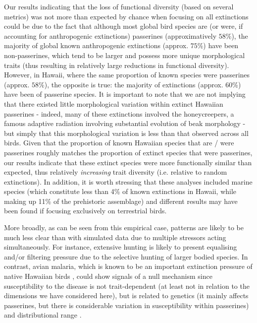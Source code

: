 \documentclass[12pt,letterpaper]{article}
\begin{document}
Our results indicating that the loss of functional diversity (based on several metrics) was not more than expected by chance when focusing on all extinctions could be due to the fact that although most global bird species are (or were, if accounting for anthropogenic extinctions) passerines (approximatively $58$\%), the majority of global known anthropogenic extinctions (approx. $75$\%) have been non-passerines, which tend to be larger and possess more unique morphological traits (thus resulting in relatively large reductions in functional diversity).
However, in Hawaii, where the same proportion of known species were passerines (approx. $58$\%), the opposite is true: the majority of extinctions (approx. $60$\%) have been of passerine species.
It is important to note that we are not implying that there existed little morphological variation within extinct Hawaiian passerines - indeed, many of these extinctions involved the honeycreepers, a famous adaptive radiation involving substantial evolution of beak morphology \citep{Walther2022} - but simply that this morphological variation is less than that observed across all birds.
Given that the proportion of known Hawaiian species that are / were passerines roughly matches the proportion of extinct species that were passerines, our results indicate that these extinct species were more functionally similar than expected, thus relatively \textit{increasing} trait diversity (i.e. relative to random extinctions).
In addition, it is worth stressing that these analyses included marine species (which constitute less than 4\% of  known extinctions in Hawaii, while making up 11\% of the prehistoric assemblage) and different results may have been found if focusing exclusively on terrestrial birds.

More broadly, as can be seen from this empirical case, patterns are likely to be much less clear than with simulated data due to multiple stressors acting simultaneously.
For instance, extensive hunting is likely to present equalising and/or filtering pressure due to the selective hunting of larger bodied species.
In contrast, avian malaria, which is known to be an important extinction pressure of native Hawaiian birds \citep{samuel2011dynamics}, could show signals of a null mechanism since susceptibility to the disease is not trait-dependent (at least not in relation to the dimensions we have considered here), but is related to genetics (it mainly affects passerines, but there is considerable variation in susceptibility within passerines) and distributional range \citep{jessup2023wildlife}.
\end{document}
